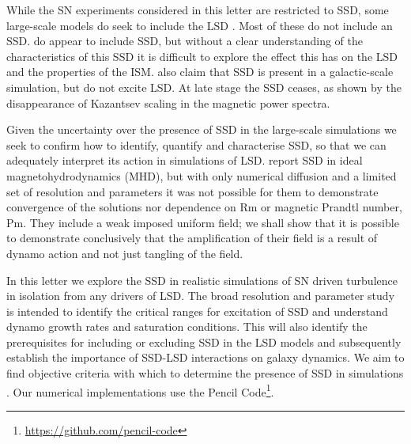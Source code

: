 \documentclass[preprint2]{aastex63}
\begin{document}
While the SN experiments considered in this letter are restricted to SSD, some
large-scale models do seek to include the LSD
\citep[e.g.,][]{Korpi:1999b,Gressel:2008,HWK09,WA09,Gent:2013b,EGSFB16,Pakmor17,SBADMN19,SDLMBP20,GE20}.
Most of these do not include an SSD.
\citet{Gent:2013b,EGSFB16} do appear to include SSD, but without a clear
understanding of the characteristics of this SSD it is difficult to explore the
effect this has on the LSD and the properties of the ISM.
\citet{SBADMN19,SDLMBP20} also claim that SSD is present in a galactic-scale
simulation, but do not excite LSD. 
At late stage the SSD ceases, as shown by
the disappearance of Kazantsev scaling in the magnetic power spectra.

Given the uncertainty over the presence of SSD in the large-scale simulations
we seek to confirm how to identify, quantify and characterise SSD, so that we
can adequately interpret its action in simulations of LSD.
\citet{BKMM04} report SSD in ideal magnetohydrodynamics (MHD), but with only
numerical diffusion and a limited set of resolution and parameters it was not
possible for them to demonstrate convergence of the solutions nor dependence on
Rm or magnetic Prandtl number, Pm.
They include a weak imposed uniform field; we shall show that it is possible
to demonstrate conclusively that the amplification of their field is a result of
dynamo action and not just tangling of the field.

In this letter we explore the SSD in realistic simulations of SN driven 
turbulence in isolation from any drivers of LSD.
The broad resolution and parameter study is intended to identify the critical
ranges for excitation of SSD and understand dynamo growth rates and saturation 
conditions.
This will also identify the prerequisites for including or excluding SSD in the
LSD models and subsequently establish the importance of SSD-LSD interactions 
on galaxy dynamics. 
We aim to find objective criteria with which to determine the presence of SSD
in simulations \citep[such as][]{Gent:2013b,GE20,SBADMN19}.
Our numerical implementations use the {\sc Pencil Code}\footnote{
\href{https://github.com/pencil-code}{https://github.com/pencil-code}}.
\end{document}
